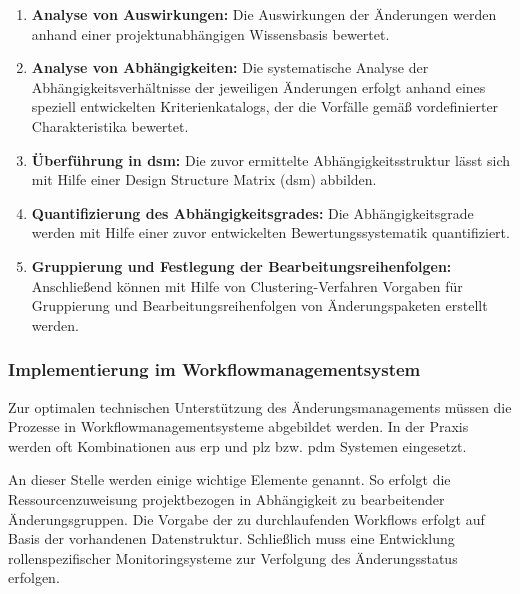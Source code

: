 \begin{enumerate}
 \item \textbf{Analyse von Auswirkungen: }
 Die Auswirkungen der Änderungen werden anhand einer projektunabhängigen Wissensbasis bewertet. 
 \item \textbf{Analyse von Abhängigkeiten: }
Die systematische Analyse der Abhängigkeitsverhältnisse der jeweiligen Änderungen erfolgt anhand eines speziell entwickelten Kriterienkatalogs, der die Vorfälle gemäß vordefinierter Charakteristika bewertet. 
\item \textbf{Überführung in \gls{dsm}: }
Die zuvor ermittelte Abhängigkeitsstruktur lässt sich mit Hilfe einer Design Structure Matrix (\gls{dsm}) abbilden. 
 \item \textbf{Quantifizierung des Abhängigkeitsgrades: }
 Die Abhängigkeitsgrade werden mit Hilfe einer zuvor entwickelten Bewertungssystematik quantifiziert.
 \item \textbf{Gruppierung und Festlegung der Bearbeitungsreihenfolgen: }
 Anschließend können mit Hilfe von Clustering-Verfahren Vorgaben für Gruppierung und Bearbeitungsreihenfolgen von Änderungspaketen erstellt werden. 
\end{enumerate}

\subsubsection*{Implementierung im Workflowmanagementsystem}
Zur optimalen technischen Unterstützung des Änderungsmanagements müssen die Prozesse in Workflowmanagementsysteme abgebildet werden. In der Praxis werden oft Kombinationen aus \gls{erp} und \gls{plz} bzw. \gls{pdm} Systemen eingesetzt. 

An dieser Stelle werden einige wichtige Elemente genannt. So erfolgt die Ressourcenzuweisung projektbezogen in Abhängigkeit zu bearbeitender Änderungsgruppen. Die Vorgabe der zu durchlaufenden Workflows erfolgt auf Basis der vorhandenen Datenstruktur. Schließlich muss eine Entwicklung rollenspezifischer Monitoringsysteme zur Verfolgung des Änderungsstatus erfolgen. 

% 
% 
% 
